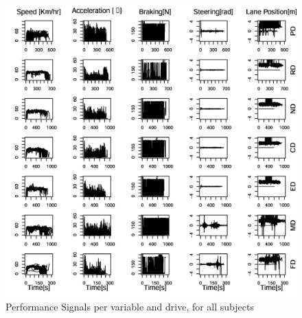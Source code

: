 \documentclass[a4paper]{article}
\begin{document}
\begin{figure}[h]
\centering
\includegraphics[width=1.0\textwidth]{Res.jpg}
\caption{\label{fig:res}Performance Signals per variable and drive, for all subjects}
\end{figure}
\FloatBarrier








% 
% 
\end{document}
